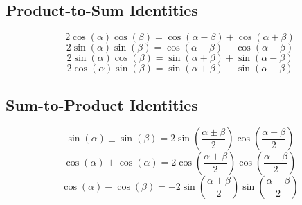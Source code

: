 	\subsection{Product-to-Sum Identities} \label{subsec:Product-to-Sum Identities}
		\begin{equation} \label{eq:Cos-Cos Product-to-Sum Identity}
			2 \cos \left( \alpha \right) \cos \left( \beta \right) = \cos \left( \alpha - \beta \right) + \cos \left( \alpha + \beta \right)
		\end{equation}
		\begin{equation} \label{eq:Sin-Sin Product-to-Sum Identity}
			2 \sin \left( \alpha \right) \sin \left( \beta \right) = \cos \left( \alpha - \beta \right) - \cos \left( \alpha + \beta \right)
		\end{equation}
		\begin{equation} \label{eq:Sin-Cos Product-to-Sum Identity}
			2 \sin \left( \alpha \right) \cos \left( \beta \right) = \sin \left( \alpha + \beta \right) + \sin \left( \alpha - \beta \right)
		\end{equation}
		\begin{equation} \label{eq:Cos-Sin Product-to-Sum Identity}
			2 \cos \left( \alpha \right) \sin \left( \beta \right) = \sin \left( \alpha + \beta \right) - \sin \left( \alpha - \beta \right)
		\end{equation}
	
	\subsection{Sum-to-Product Identities} \label{subsec:Sum-to-Product Identities}
		\begin{equation} \label{eq:Sin Sum-to-Product Identity}
			\sin \left( \alpha \right) \pm \sin \left( \beta \right) = 2 \sin \left( \frac{ \alpha \pm \beta}{2} \right) \cos \left( \frac{\alpha \mp \beta}{2} \right)
		\end{equation}
		\begin{equation} \label{eq:Cos+Cos Sum-to-Product Identity}
			\cos \left( \alpha \right) + \cos \left( \alpha \right) = 2 \cos \left( \frac{\alpha + \beta}{2} \right) \cos \left( \frac{\alpha - \beta}{2} \right)
		\end{equation}
		\begin{equation} \label{eq:Cos-Cos Sum-to-Product Identity}
			\cos \left( \alpha \right) - \cos \left( \beta \right) = -2 \sin \left( \frac{\alpha + \beta}{2} \right) \sin \left( \frac{\alpha - \beta}{2} \right)
		\end{equation}
	

